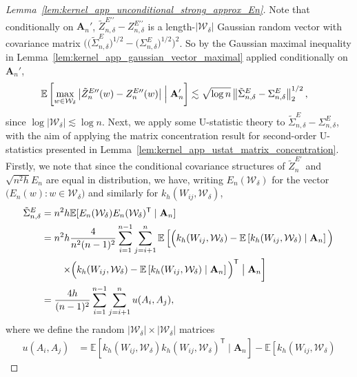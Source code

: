 \documentclass[11pt,lof]{puthesis}
\newcommand{\E}{\ensuremath{\mathbb{E}}}
\newcommand{\bA}{\ensuremath{\mathbf{A}}}
\newcommand{\cW}{\ensuremath{\mathcal{W}}}
\newcommand{\T}{\ensuremath{\mathsf{T}}}
\newcommand{\dprime}{\ensuremath{\prime\prime}}
\theoremstyle{break}
\theoremstyle{proof}
\newtheorem{proof}{Proof}
\begin{document}
\begin{proof}[Lemma~\ref{lem:kernel_app_unconditional_strong_approx_En}]
  Note that conditionally on $\bA_n'$,
  $\tilde Z_{n,\delta}^{E\dprime} - Z_{n,\delta}^{E\dprime}$
  is a length-$|\cW_\delta|$
  Gaussian random vector with covariance matrix
  $\big(
    \big(\tilde \Sigma^E_{n,\delta}\big)^{1/2}
    - \big(\Sigma^E_{n,\delta}\big)^{1/2}
  \big)^2$.
  So by the Gaussian maximal inequality in
  Lemma~\ref{lem:kernel_app_gaussian_vector_maximal}
  applied conditionally on $\bA_n'$,
  \begin{align*}
    \E\left[
      \max_{w \in \cW_\delta}
      \big|\tilde Z_n^{E\dprime}(w) - Z_n^{E\dprime}(w)\big|
      \Bigm| \bA_n'
    \right]
    &\lesssim
    \sqrt{\log n}
    \left\|
      \tilde\Sigma^E_{n,\delta}
      - \Sigma^E_{n,\delta}
    \right\|_2^{1/2},
  \end{align*}
  since $\log |\cW_\delta| \lesssim \log n$.
  Next, we apply some U-statistic theory to
  $\tilde\Sigma^E_{n,\delta} - \Sigma^E_{n,\delta}$,
  with the aim of applying the
  matrix concentration result
  for second-order U-statistics
  presented in Lemma~\ref{lem:kernel_app_ustat_matrix_concentration}.
  Firstly, we note that
  since
  the conditional covariance structures of
  $\tilde Z_n^{E\prime}$ and $\sqrt{n^2h} E_n$
  are equal in distribution,
  we have,
  writing $E_n(\cW_\delta)$
  for the vector $\big(E_n(w) : w \in \cW_\delta\big)$
  and similarly for $k_h(W_{i j}, \cW_\delta)$,
  \begin{align*}
    \tilde\Sigma^E_{n,\delta}
    &=
    n^2h \E[E_n(\cW_\delta) E_n(\cW_\delta)^\T \mid \bA_n] \\
    &=
    n^2h
    \frac{4}{n^2(n-1)^2}
    \sum_{i=1}^{n-1}
    \sum_{j=i+1}^{n}
    \E\left[
      \Big(
        k_h(W_{i j}, \cW_\delta)
        - \E\left[
          k_h(W_{i j}, \cW_\delta)
          \mid \bA_n
        \right]
      \Big)
    \right. \\
    &\qquad\left.
      \times\Big(
        k_h(W_{i j}, \cW_\delta)
        - \E\left[
          k_h(W_{i j}, \cW_\delta)
          \mid \bA_n
        \right]
      \Big)^\T
      \bigm\vert \bA_n
    \right] \\
    &=
    \frac{4h}{(n-1)^2}
    \sum_{i=1}^{n-1}
    \sum_{j=i+1}^{n}
    u(A_i, A_j),
  \end{align*}
  where we
  define the random
  $|\cW_\delta| \times |\cW_\delta|$
  matrices
  \begin{align*}
    u(A_i, A_j)
    &=
    \E\!\left[
      k_h(W_{i j}, \cW_\delta)
      k_h(W_{i j}, \cW_\delta)^\T
      \mid \bA_n
    \right]
    -
    \E\!\left[
      k_h(W_{i j}, \cW_\delta)

\end{align*}
\end{proof}
\end{document}
